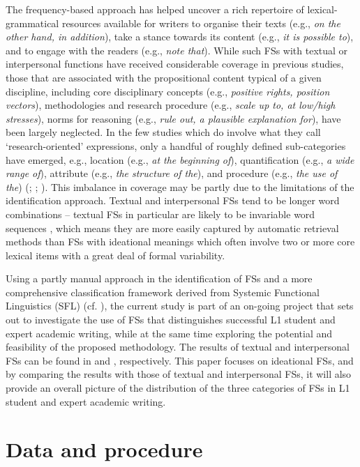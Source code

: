 The frequency-based approach has helped uncover a rich repertoire of lexical-grammatical resources available for writers to organise their texts (e.g., \textit{on the other hand, in addition}), take a stance towards its content (e.g., \textit{it is possible to}), and to engage with the readers (e.g., \textit{note that}). While such FSs with textual or interpersonal functions have received considerable coverage in previous studies, those that are associated with the propositional content typical of a given discipline, including core disciplinary concepts (e.g., \textit{positive rights, position vectors}), methodologies and research procedure (e.g., \textit{scale up to, at low/high stresses}), norms for reasoning (e.g., \textit{rule out, a plausible explanation for}), have been largely neglected. In the few studies which do involve what they call ‘research-oriented’ expressions, only a handful of roughly defined sub-categories have emerged, e.g., location (e.g., \textit{at the beginning of}), quantification (e.g., \textit{a wide range of}), attribute (e.g., \textit{the structure of the}), and procedure (e.g., \textit{the use of the}) (\citealt{Cortes2004}; \citealt{BiberEtAl2004}; \citealt{Hyland2008}). This imbalance in coverage may be partly due to the limitations of the identification approach. Textual and interpersonal FSs tend to be longer word combinations – textual FSs in particular are likely to be invariable word sequences \citep{Wang2019}, which means they are more easily captured by automatic retrieval methods than FSs with ideational meanings which often involve two or more core lexical items with a great deal of formal variability. 

Using a partly manual approach in the identification of FSs and a more comprehensive classification framework derived from Systemic Functional Linguistics (SFL) (cf. ), the current study is part of an on-going project that sets out to investigate the use of FSs that distinguishes successful L1 student and expert academic writing, while at the same time exploring the potential and feasibility of the proposed methodology. The results of textual and interpersonal FSs can be found in \citet{Wang2018} and \citet{Wang2019}, respectively. This paper focuses on ideational FSs, and by comparing the results with those of textual and interpersonal FSs, it will also provide an overall picture of the distribution of the three categories of FSs in L1 student and expert academic writing.

\section{Data and procedure}
